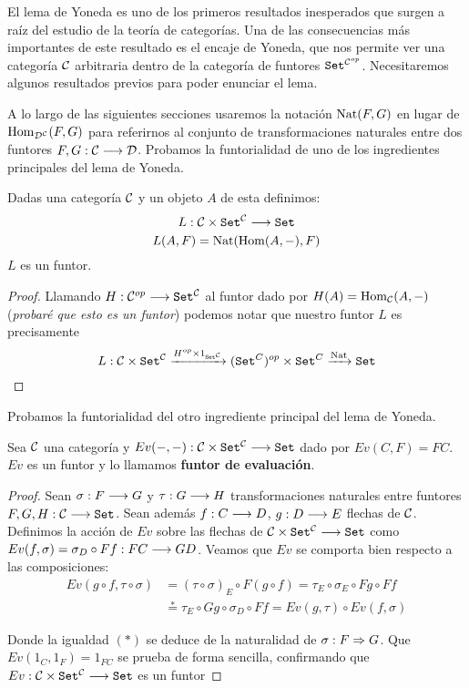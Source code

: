 El lema de Yoneda es uno de los primeros resultados
inesperados que surgen a raíz del
estudio de la teoría de categorías. Una
de las consecuencias más importantes de este resultado es
el encaje de Yoneda, que nos permite
ver una categoría $\mathcal{C}$ arbitraria dentro de la categoría de
funtores $\texttt{Set}^{\mathcal{C}^{op}}$. Necesitaremos algunos resultados
previos para poder enunciar el lema.

A lo largo de las siguientes
secciones usaremos la notación $\operatorname{Nat}(F, G)$ en lugar de
$\operatorname{Hom}_{\mathcal{D}^{\mathcal{C}}}(F, G)$ para referirnos al conjunto de
transformaciones naturales entre dos funtores
$F, G: \mathcal{C}\longrightarrow \mathcal{D}$. Probamos la funtorialidad de uno de los
ingredientes principales del lema de Yoneda.
\begin{proposition*}
  Dadas una categoría $\mathcal{C}$ y un objeto $A$ de esta definimos:
  $$L : \mathcal{C}\times\texttt{Set}^{\mathcal{C}}\longrightarrow \texttt{Set}$$
  $$L(A, F) = \operatorname{Nat}(\operatorname{Hom}(A, -), F)$$
  $L$ es un funtor.
\end{proposition*}
\begin{proof}
  Llamando
  $H: \mathcal{C}^{op}\longrightarrow \texttt{Set}^{\mathcal{C}}$ al funtor dado por
  $H(A) = \operatorname{Hom}_{\mathcal{C}}(A, -)$
  (\textit{probaré que esto es un funtor})
  podemos notar que nuestro funtor $L$ es precisamente
  $$L :\mathcal{C}\times\texttt{Set}^{\mathcal{C}}
  \xrightarrow{H^{op}\times 1_{\texttt{Set}^{\mathcal{C}}}}
  (\texttt{Set}^{C})^{op} \times \texttt{Set}^{C}
  \xrightarrow{\operatorname{Nat}} \texttt{Set}$$
\end{proof}
Probamos la funtorialidad
del otro ingrediente principal del lema de Yoneda.
\begin{proposition*}
  Sea $\mathcal{C}$ una categoría y $Ev(-, -) : \mathcal{C}\times\texttt{Set}^{\mathcal{C}}\longrightarrow \texttt{Set}$
  dado por $Ev(C, F) = FC$. $Ev$ es un funtor y lo llamamos
  \textbf{funtor de evaluación}.
\end{proposition*}
\begin{proof}
  Sean $\sigma : F\longrightarrow G$ y $\tau : G\longrightarrow H$ transformaciones naturales entre funtores
  $F, G, H : \mathcal{C}\longrightarrow \texttt{Set}$. Sean además $f : C\longrightarrow D$,
  $g : D\longrightarrow E$ flechas de $\mathcal{C}$.
  Definimos la acción de $Ev$ sobre las flechas de
  $\mathcal{C}\times\texttt{Set}^{\mathcal{C}}\longrightarrow \texttt{Set}$ como
  $Ev(f, \sigma) = \sigma_D \circ Ff : FC\longrightarrow GD$. Veamos que $Ev$ se comporta bien
  respecto a las composiciones:
  \begin{align*}
    Ev(g \circ f, \tau\circ\sigma) &
     = (\tau \circ \sigma)_E\circ F(g\circ f)
     = \tau_E\circ\sigma_E\circ Fg \circ Ff \\
     & \stackrel{*}{=}
  \tau_E\circ Gg \circ\sigma_D \circ Ff
  = Ev(g, \tau) \circ Ev(f, \sigma)
  \end{align*}

  Donde la igualdad $(*)$ se deduce de la
  naturalidad de $\sigma : F\Rightarrow G$.
  Que $Ev(1_C, 1_F) = 1_{FC}$ se prueba de forma sencilla,
  confirmando que $Ev : \mathcal{C}\times\texttt{Set}^{\mathcal{C}}\longrightarrow \texttt{Set}$ es un funtor
\end{proof}
